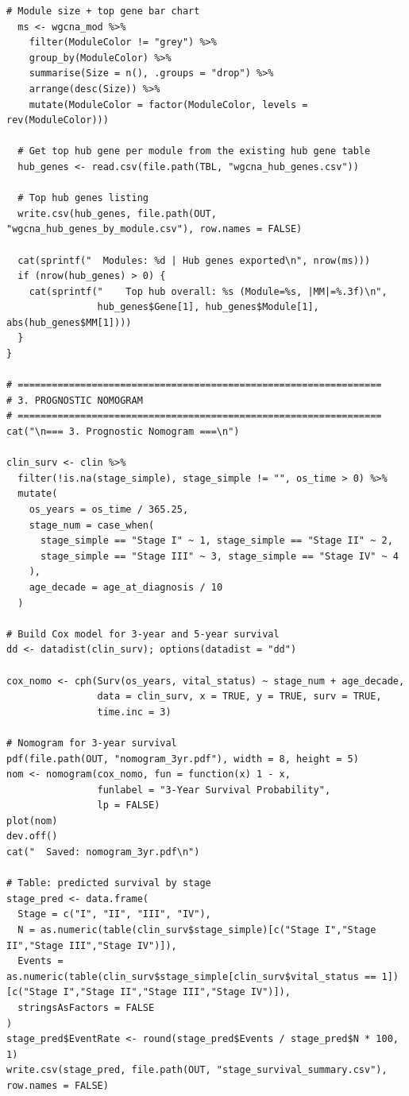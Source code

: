\documentclass[12pt,a4paper]{ctexart}
\begin{document}
\begin{lstlisting}[caption={20_deep_analysis}, basicstyle=\ttfamily\scriptsize]
  # Module size + top gene bar chart
  ms <- wgcna_mod %>%
    filter(ModuleColor != "grey") %>%
    group_by(ModuleColor) %>%
    summarise(Size = n(), .groups = "drop") %>%
    arrange(desc(Size)) %>%
    mutate(ModuleColor = factor(ModuleColor, levels = rev(ModuleColor)))

  # Get top hub gene per module from the existing hub gene table
  hub_genes <- read.csv(file.path(TBL, "wgcna_hub_genes.csv"))

  # Top hub genes listing
  write.csv(hub_genes, file.path(OUT, "wgcna_hub_genes_by_module.csv"), row.names = FALSE)

  cat(sprintf("  Modules: %d | Hub genes exported\n", nrow(ms)))
  if (nrow(hub_genes) > 0) {
    cat(sprintf("    Top hub overall: %s (Module=%s, |MM|=%.3f)\n",
                hub_genes$Gene[1], hub_genes$Module[1], abs(hub_genes$MM[1])))
  }
}

# ================================================================
# 3. PROGNOSTIC NOMOGRAM
# ================================================================
cat("\n=== 3. Prognostic Nomogram ===\n")

clin_surv <- clin %>%
  filter(!is.na(stage_simple), stage_simple != "", os_time > 0) %>%
  mutate(
    os_years = os_time / 365.25,
    stage_num = case_when(
      stage_simple == "Stage I" ~ 1, stage_simple == "Stage II" ~ 2,
      stage_simple == "Stage III" ~ 3, stage_simple == "Stage IV" ~ 4
    ),
    age_decade = age_at_diagnosis / 10
  )

# Build Cox model for 3-year and 5-year survival
dd <- datadist(clin_surv); options(datadist = "dd")

cox_nomo <- cph(Surv(os_years, vital_status) ~ stage_num + age_decade,
                data = clin_surv, x = TRUE, y = TRUE, surv = TRUE,
                time.inc = 3)

# Nomogram for 3-year survival
pdf(file.path(OUT, "nomogram_3yr.pdf"), width = 8, height = 5)
nom <- nomogram(cox_nomo, fun = function(x) 1 - x,
                funlabel = "3-Year Survival Probability",
                lp = FALSE)
plot(nom)
dev.off()
cat("  Saved: nomogram_3yr.pdf\n")

# Table: predicted survival by stage
stage_pred <- data.frame(
  Stage = c("I", "II", "III", "IV"),
  N = as.numeric(table(clin_surv$stage_simple)[c("Stage I","Stage II","Stage III","Stage IV")]),
  Events = as.numeric(table(clin_surv$stage_simple[clin_surv$vital_status == 1])[c("Stage I","Stage II","Stage III","Stage IV")]),
  stringsAsFactors = FALSE
)
stage_pred$EventRate <- round(stage_pred$Events / stage_pred$N * 100, 1)
write.csv(stage_pred, file.path(OUT, "stage_survival_summary.csv"), row.names = FALSE)


\end{lstlisting}
\end{document}
